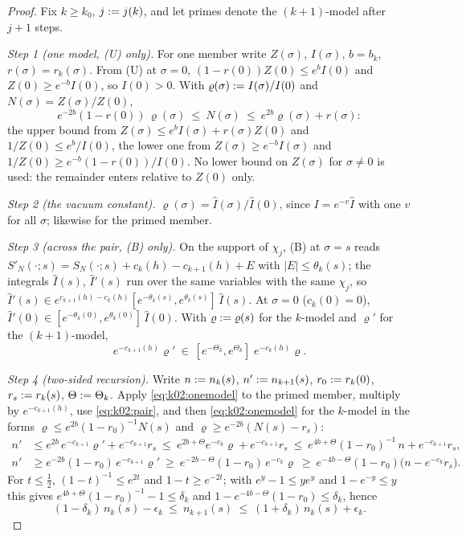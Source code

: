 \begin{proof}
Fix $k\ge k_0$, $j:= j(k)$, and let primes denote the $(k+1)$-model after $j+1$ steps.

\emph{Step 1 (one model, \textup{(U)} only).} For one member write $Z(\sigma)$, $I(\sigma)$, $b=b_k$, $r(\sigma)=r_k(\sigma)$. From (U) at $\sigma=0$, $(1-r(0))Z(0)\le e^{b}I(0)$ and $Z(0)\ge e^{-b}I(0)$, so $I(0)>0$. With $\varrho(\sigma):= I(\sigma)/I(0)$ and $N(\sigma)=Z(\sigma)/Z(0)$,
\begin{equation}\label{eq:k02:onemodel}
e^{-2b}(1-r(0))\,\varrho(\sigma)\ \le\ N(\sigma)\ \le\ e^{2b}\varrho(\sigma)+r(\sigma):
\end{equation}
the upper bound from $Z(\sigma)\le e^{b}I(\sigma)+r(\sigma)Z(0)$ and $1/Z(0)\le e^{b}/I(0)$, the lower one from $Z(\sigma)\ge e^{-b}I(\sigma)$ and $1/Z(0)\ge e^{-b}(1-r(0))/I(0)$. No lower bound on $Z(\sigma)$ for $\sigma\ne0$ is used: the remainder enters relative to $Z(0)$ only.

\emph{Step 2 (the vacuum constant).} $\varrho(\sigma)=\hat I(\sigma)/\hat I(0)$, since $I=e^{-v}\hat I$ with one $v$ for all $\sigma$; likewise for the primed member.

\emph{Step 3 (across the pair, \textup{(B)} only).} On the support of $\chi_j$, (B) at $\sigma=s$ reads $S'_N(\cdot;s)=S_N(\cdot;s)+c_k(h)-c_{k+1}(h)+E$ with $|E|\le\theta_k(s)$; the integrals $\hat I(s)$, $\hat I'(s)$ run over the same variables with the same $\chi_j$, so $\hat I'(s)\in e^{c_{k+1}(h)-c_k(h)}[e^{-\theta_k(s)},e^{\theta_k(s)}]\,\hat I(s)$. At $\sigma=0$ ($c_k(0)=0$), $\hat I'(0)\in[e^{-\theta_k(0)},e^{\theta_k(0)}]\,\hat I(0)$. With $\varrho:=\varrho(s)$ for the $k$-model and $\varrho'$ for the $(k+1)$-model,
\begin{equation}\label{eq:k02:pair}
e^{-c_{k+1}(h)}\varrho'\ \in\ [e^{-\Theta_k},e^{\Theta_k}]\;e^{-c_k(h)}\varrho .
\end{equation}

\emph{Step 4 (two-sided recursion).} Write $n:= n_k(s)$, $n':= n_{k+1}(s)$, $r_0:= r_k(0)$, $r_s:= r_k(s)$, $\Theta:=\Theta_k$. Apply \eqref{eq:k02:onemodel} to the primed member, multiply by $e^{-c_{k+1}(h)}$, use \eqref{eq:k02:pair}, and then \eqref{eq:k02:onemodel} for the $k$-model in the forms $\varrho\le e^{2b}(1-r_0)^{-1}N(s)$ and $\varrho\ge e^{-2b}(N(s)-r_s)$:
\begin{align*}
n'&\le e^{2b}\,e^{-c_{k+1}}\varrho'+e^{-c_{k+1}}r_s\ \le\ e^{2b+\Theta}e^{-c_k}\varrho+e^{-c_{k+1}}r_s\ \le\ e^{4b+\Theta}(1-r_0)^{-1}\,n+e^{-c_{k+1}}r_s,\\
n'&\ge e^{-2b}(1-r_0)\,e^{-c_{k+1}}\varrho'\ \ge\ e^{-2b-\Theta}(1-r_0)\,e^{-c_k}\varrho\ \ge\ e^{-4b-\Theta}(1-r_0)\big(n-e^{-c_k}r_s\big).
\end{align*}
For $t\le\frac12$, $(1-t)^{-1}\le e^{2t}$ and $1-t\ge e^{-2t}$; with $e^{y}-1\le ye^{y}$ and $1-e^{-y}\le y$ this gives $e^{4b+\Theta}(1-r_0)^{-1}-1\le\delta_k$ and $1-e^{-4b-\Theta}(1-r_0)\le\delta_k$, hence
\begin{equation}\label{eq:k02:rec}
(1-\delta_k)\,n_k(s)-\epsilon_k\ \le\ n_{k+1}(s)\ \le\ (1+\delta_k)\,n_k(s)+\epsilon_k .
\end{equation}


\end{proof}
